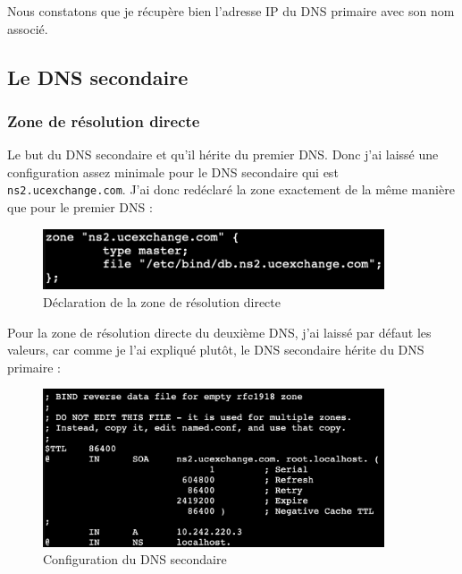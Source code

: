 \documentclass[12pt, a4paper]{article}
\begin{document}
    Nous constatons que je récupère bien l'adresse IP du DNS primaire avec son nom
    associé.\\





    \subsection{Le DNS secondaire}
    \subsubsection{Zone de résolution directe}

    Le but du DNS secondaire et qu'il hérite du premier DNS. Donc
    j'ai laissé une configuration assez minimale pour le DNS secondaire qui
    est \texttt{ns2.ucexchange.com}. J'ai donc redéclaré la zone
    exactement de la même manière que pour le premier DNS : 

    \begin{figure}[h]
		\centering
		\includegraphics[width=0.9\textwidth]{img/ns2-de.png}
		\caption{Déclaration de la zone de résolution directe}
		\label{fig:ns2-de}
	\end{figure}

    \newpage

    Pour la zone de résolution directe du deuxième DNS, j'ai laissé 
    par défaut les valeurs, car comme je l'ai expliqué plutôt, le DNS secondaire
    hérite du DNS primaire :\\

    \begin{figure}[h]
		\centering
		\includegraphics[width=0.9\textwidth]{img/ns2-ex.png}
		\caption{Configuration du DNS secondaire}
		\label{fig:ns2-ex}
	\end{figure}
    
\end{document}
